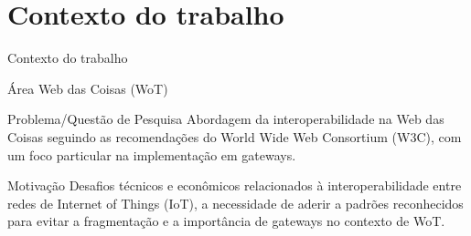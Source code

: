 \section{Contexto do trabalho}

\begin{frame}{Contexto do trabalho}
    
    \begin{block}{Área}
        Web das Coisas (WoT)
    \end{block}

    \begin{block}{Problema/Questão de Pesquisa}
        Abordagem da interoperabilidade na Web das Coisas seguindo as recomendações do World Wide Web Consortium (W3C), com um foco particular na implementação em gateways.
    \end{block}

    \begin{block}{Motivação}
        Desafios técnicos e econômicos relacionados à interoperabilidade entre redes de Internet of Things (IoT), a necessidade de aderir a padrões reconhecidos para evitar a fragmentação e a importância de gateways no contexto de WoT.
    \end{block}


\end{frame}